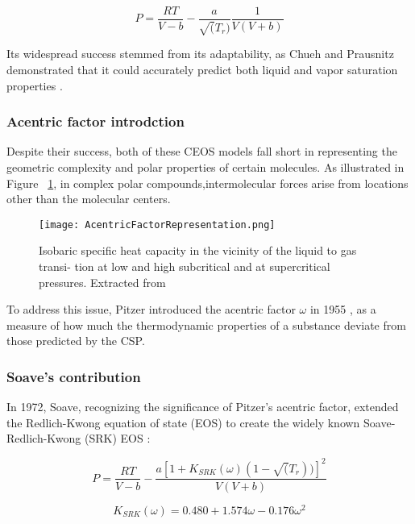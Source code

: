 	\begin{equation}
		P = \frac{RT}{V-b} - \frac{a}{\sqrt(T_r)}\frac{1}{V(V+b)}
	\end{equation}

	Its widespread success stemmed from its adaptability, as Chueh and Prausnitz
	demonstrated that it could accurately predict both liquid and vapor
	saturation properties \cite{chueh1967vapor1, chueh1967vapor2}.

	\subsubsection{Acentric factor introdction}

	Despite their success, both of these CEOS models fall short in representing
	the geometric complexity and polar properties of certain molecules. As
	illustrated in Figure ~\ref{AcentricFactorRepresentation}, in complex polar
	compounds,intermolecular forces arise from locations other than the
	molecular centers.

	\begin{figure}[h!]
		\centering
		\texttt{[image: AcentricFactorRepresentation.png]}
		\caption{Isobaric specific heat capacity in the vicinity of the liquid
		to gas transi- tion at low and high subcritical and at supercritical
		pressures. Extracted from \cite{banuti2019latent}}
	\label{AcentricFactorRepresentation}
	\end{figure}

	To address this issue, Pitzer introduced the acentric factor $\omega$ in
	1955 \cite{pitzer1955volumetric}, as a measure of how much the thermodynamic
	properties of a substance deviate from those predicted by the CSP.

	\subsubsection{Soave's contribution}

	In 1972, Soave, recognizing the significance of Pitzer's acentric factor,
	extended the Redlich-Kwong equation of state (EOS) to create the widely
	known Soave-Redlich-Kwong (SRK) EOS \cite{soave1972equilibrium}:

	\begin{equation}
		P = \frac{RT}{V-b}-\frac{a[1+K_{SRK}(\omega)(1-\sqrt(T_r))]^2}{V(V+b)}
	\end{equation}

	\begin{equation}
		K_{SRK}(\omega) = 0.480 + 1.574\omega -0.176\omega^2
	\end{equation}


